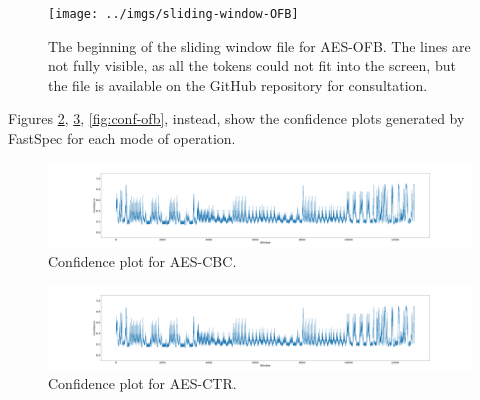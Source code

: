 \documentclass[12pt,a4paper]{book}
\theoremstyle{definition}
\begin{document}
	\begin{figure}[!ht]
		\centering
		\texttt{[image: ../imgs/sliding-window-OFB]}
		\caption{The beginning of the sliding window file for AES-OFB. The lines are not fully visible, as all the tokens could not fit into the screen, but the file is available on the GitHub repository for consultation.}
		\label{fig:sliding-wnd}
	\end{figure}

	Figures \ref{fig:conf-cbc}, \ref{fig:conf-ctr}, \ref{fig:conf-ofb}, instead, show the confidence plots generated by FastSpec for each mode of operation. 
	
	\begin{figure}[!ht]
		\hspace*{-3.6cm}
		\includegraphics[scale=0.18]{../test_files/output_nosymbolic_FastSpec_wider/window50_overlap49_fig/testing_AES_CBC_nosymbolic.png}
		\caption{Confidence plot for AES-CBC.}
		\label{fig:conf-cbc}
	\end{figure}

	\begin{figure}[!ht]
		\hspace*{-3.6cm}
		\includegraphics[scale=0.18]{../test_files/output_nosymbolic_FastSpec_wider/window50_overlap49_fig/testing_AES_CBC_nosymbolic.png}
		\caption{Confidence plot for AES-CTR.}
		\label{fig:conf-ctr}		
	\end{figure}
\end{document}
